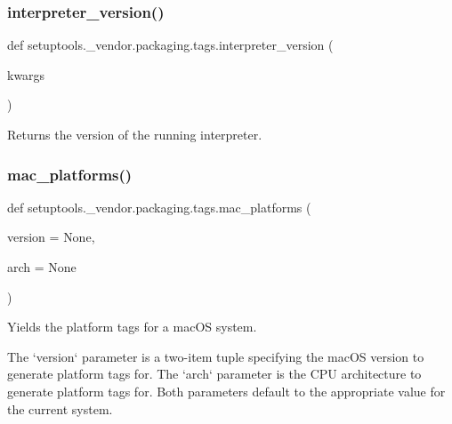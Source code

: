 \subsubsection{\texorpdfstring{interpreter\+\_\+version()}{interpreter\_version()}}
{\footnotesize\ttfamily def setuptools.\+\_\+vendor.\+packaging.\+tags.\+interpreter\+\_\+version (\begin{DoxyParamCaption}\item[{}]{kwargs }\end{DoxyParamCaption})}

\begin{DoxyVerb}Returns the version of the running interpreter.
\end{DoxyVerb}
 \mbox{\label{namespacesetuptools_1_1__vendor_1_1packaging_1_1tags_a5f521f37fd1b85e8df64b489152a62e4}} 
\subsubsection{\texorpdfstring{mac\+\_\+platforms()}{mac\_platforms()}}
{\footnotesize\ttfamily def setuptools.\+\_\+vendor.\+packaging.\+tags.\+mac\+\_\+platforms (\begin{DoxyParamCaption}\item[{}]{version = {\ttfamily None},  }\item[{}]{arch = {\ttfamily None} }\end{DoxyParamCaption})}

\begin{DoxyVerb}Yields the platform tags for a macOS system.

The `version` parameter is a two-item tuple specifying the macOS version to
generate platform tags for. The `arch` parameter is the CPU architecture to
generate platform tags for. Both parameters default to the appropriate value
for the current system.
\end{DoxyVerb}
 \mbox{\label{namespacesetuptools_1_1__vendor_1_1packaging_1_1tags_a16a40a874f5261641cd9bd5331cb7034}} 
